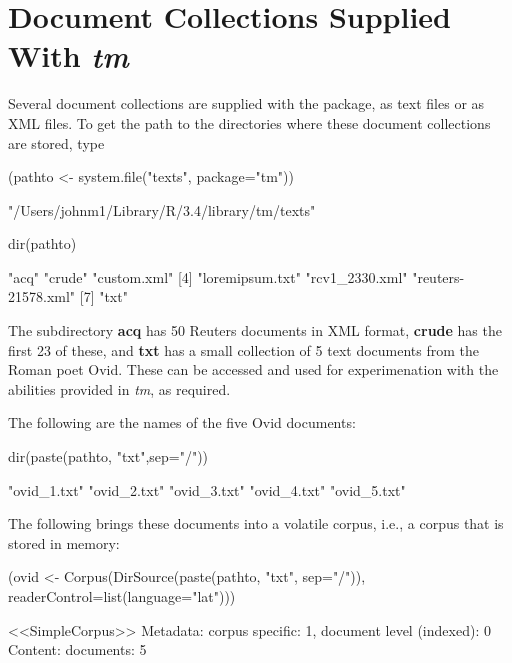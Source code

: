 \documentclass{tufte-book}\usepackage[]{graphicx}\usepackage[]{color}
\begin{document}
\section{Document Collections Supplied With {\em tm}}
Several document collections are supplied with the package,
as text files or as XML files.  To get the path to the
directories where these document collections are stored, type
\begin{fullwidth}

\begin{Schunk}
\begin{Sinput}
(pathto <- system.file("texts", package="tm"))
\end{Sinput}
\begin{Soutput}
[1] "/Users/johnm1/Library/R/3.4/library/tm/texts"
\end{Soutput}
\begin{Sinput}
dir(pathto)
\end{Sinput}
\begin{Soutput}
[1] "acq"               "crude"             "custom.xml"       
[4] "loremipsum.txt"    "rcv1_2330.xml"     "reuters-21578.xml"
[7] "txt"              
\end{Soutput}
\end{Schunk}

\end{fullwidth}
The subdirectory \textbf{acq} has 50 Reuters documents in XML format,
\textbf{crude} has the first 23 of these, and \textbf{txt} has a
small collection of 5 text documents from the Roman poet Ovid.
These can be accessed and used for experimenation with the abilities
provided in {\em tm}, as required.

The following are the names of the five Ovid documents:
\begin{fullwidth}

\begin{Schunk}
\begin{Sinput}
dir(paste(pathto, "txt",sep="/"))
\end{Sinput}
\begin{Soutput}
[1] "ovid_1.txt" "ovid_2.txt" "ovid_3.txt" "ovid_4.txt" "ovid_5.txt"
\end{Soutput}
\end{Schunk}

\end{fullwidth}

The following brings these documents into a volatile corpus, i.e.,
a corpus that is stored in memory:
\begin{Schunk}
\begin{Sinput}
(ovid <-
   Corpus(DirSource(paste(pathto, "txt", sep="/")),
          readerControl=list(language="lat")))
\end{Sinput}
\begin{Soutput}
<<SimpleCorpus>>
Metadata:  corpus specific: 1, document level (indexed): 0
Content:  documents: 5
\end{Soutput}
\end{Schunk}
\end{document}
